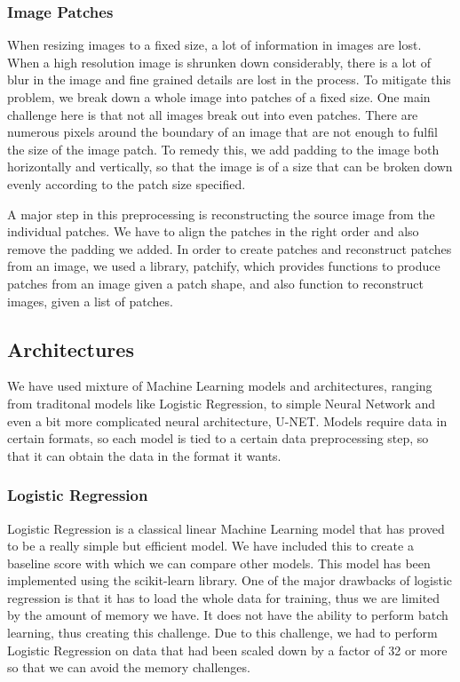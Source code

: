 \subsubsection{Image Patches}

When resizing images to a fixed size, a lot of information in images are lost. When a high resolution image is shrunken down considerably, there is a
lot of blur in the image and fine grained details are lost in the process. To mitigate this problem, we break down a whole image into patches of 
a fixed size. One main challenge here is that not all images break out into even patches. There are numerous pixels around the boundary of an image 
that are not enough to fulfil the size of the image patch. To remedy this, we add padding to the image both horizontally and vertically, so that the 
image is of a size that can be broken down evenly according to the patch size specified.

A major step in this preprocessing is reconstructing the source image from the individual patches. We have to align the patches in the right order
and also remove the padding we added. In order to create patches and reconstruct patches from an image, we used a library, patchify, which provides
functions to produce patches from an image given a patch shape, and also function to reconstruct images, given a list of patches. 

\subsection{Architectures}

We have used mixture of Machine Learning models and architectures, ranging from traditonal models like Logistic Regression, to simple Neural Network
and even a bit more complicated neural architecture, U-NET. Models require data in certain formats, so each model is tied to a certain data 
preprocessing step, so that it can obtain the data in the format it wants.

\subsubsection{Logistic Regression}

Logistic Regression is a classical linear Machine Learning model that has proved to be a really simple but efficient model. We have included this to create 
a baseline score with which we can compare other models. This model has been implemented using the scikit-learn library. One of the major drawbacks of logistic
regression is that it has to load the whole data for training, thus we are limited by the amount of memory we have. It does not have the ability to perform
batch learning, thus creating this challenge. Due to this challenge, we had to perform Logistic Regression on data that had been scaled down by a factor
of 32 or more so that we can avoid the memory challenges.

